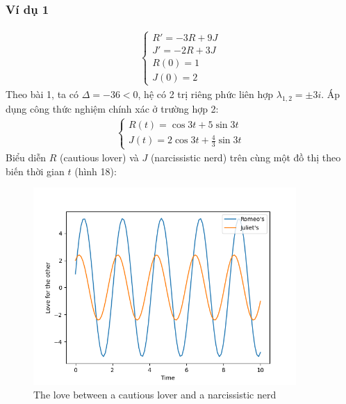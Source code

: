 \subsubsection{Ví dụ 1}
\begin{align*}
    \begin{cases}
        R'=-3R+9J\\
        J'=-2R+3J\\
        R(0)=1\\
        J(0)=2
    \end{cases}
\end{align*}
Theo bài 1, ta có $\Delta=-36<0$, hệ có 2 trị riêng phức liên hợp $\lambda_{1,2}= \pm 3i$. Áp dụng công thức nghiệm chính xác ở trường hợp 2:
\begin{align*}
    \begin{cases}
        R(t)=\cos{3t}+5\sin{3t}\\
        J(t)=2\cos{3t}+\frac{4}{3}\sin{3t}
    \end{cases}
\end{align*}
Biểu diễn $R$ (cautious lover) và $J$ (narcissistic nerd) trên cùng một đồ thị theo biến thời gian $t$ (hình 18):
\begin{figure}[h!]
    \begin{center}
    \includegraphics[width=10cm]{images/cautious_lover_1.png}
    \end{center}
    \caption{The love between a cautious lover and a narcissistic nerd}
\end{figure}
